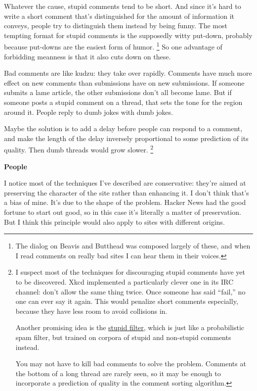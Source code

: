 \documentclass[12pt]{book}
\begin{document}
Whatever the cause, stupid comments tend to be short. And since it's
hard to write a short comment that's distinguished for the amount of
information it conveys, people try to distinguish them instead by being
funny. The most tempting format for stupid comments is the supposedly
witty put-down, probably because put-downs are the easiest form of
humor. \footnote{The dialog on Beavis and Butthead was composed largely of these,
and when I read comments on really bad sites I can hear them in their
voices.} So one advantage of forbidding meanness
is that it also cuts down on these.

Bad comments are like kudzu: they take over rapidly. Comments have much
more effect on new comments than submissions have on new submissions. If
someone submits a lame article, the other submissions don't all become
lame. But if someone posts a stupid comment on a thread, that sets the
tone for the region around it. People reply to dumb jokes with dumb
jokes.

Maybe the solution is to add a delay before people can respond to a
comment, and make the length of the delay inversely proportional to some
prediction of its quality. Then dumb threads would grow slower.
\footnote{I suspect most of the techniques for discouraging stupid
comments have yet to be discovered. Xkcd implemented a particularly
clever one in its IRC channel: don't allow the same thing twice. Once
someone has said ``fail,'' no one can ever say it again. This would
penalize short comments especially, because they have less room to avoid
collisions in.

Another promising idea is the \href{http://stupidfilter.org}{stupid
filter}, which is just like a probabilistic spam filter, but trained on
corpora of stupid and non-stupid comments instead.

You may not have to kill bad comments to solve the problem. Comments at
the bottom of a long thread are rarely seen, so it may be enough to
incorporate a prediction of quality in the comment sorting algorithm.}

\textbf{People}

I notice most of the techniques I've described are conservative: they're
aimed at preserving the character of the site rather than enhancing it.
I don't think that's a bias of mine. It's due to the shape of the
problem. Hacker News had the good fortune to start out good, so in this
case it's literally a matter of preservation. But I think this principle
would also apply to sites with different origins.
\end{document}
